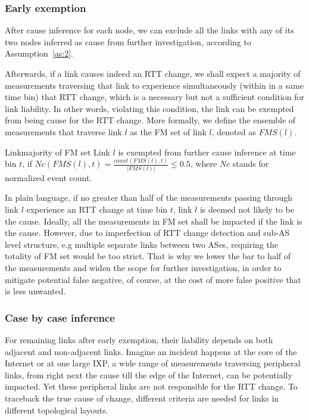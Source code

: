 \subsubsection{Early exemption}

After cause inference for each node, we can exclude all the links with any of its two nodes inferred as cause from further investigation, according to Assumption~\ref{as:2}.

Afterwards, if a link causes indeed an RTT change, we shall expect a majority of measurements traversing that link to experience simultaneously (within in a same time bin) that RTT change, which is a necessary but not a sufficient condition for link liability. In other words, violating this condition, the link can be exempted from being cause for the RTT change.
More formally, we define the ensemble of measurements that traverse link $l$ as the \acf{FM} set of link $l$, denoted as $FMS(l)$. 

\begin{heuristic}{Link}{majority of \ac{FM} set}\label{hu:link}
Link $l$ is exempted from further cause inference at time bin $t$, if $Nc(FMS(l), t) = \frac{count(FMS(l), t)}{|FMS(l)|} \leq 0.5$, where $Nc$ stands for normalized event count.
\end{heuristic}

In plain language, if no greater than half of the measurements passing through link $l$ experience an RTT change at time bin $t$, link $l$ is deemed not likely to be the cause. 
Ideally, all the measurements in \ac{FM} set shall be impacted if the link is the cause. However, due to imperfection of RTT change detection and sub-AS level structure, e.g multiple separate links between two ASes, requiring the totality of \ac{FM} set would be too strict. That is why we lower the bar to half of the measurements and widen the scope for further investigation, in order to mitigate potential false negative, of course, at the cost of more false positive that is less unwanted.

\subsubsection{Case by case inference}

For remaining links after early exemption, their liability depends on both adjacent and non-adjacent links. Imagine an incident happens at the core of the Internet or at one large IXP, a wide range of measurements traversing peripheral links, from right next the cause till the edge of the Internet, can be potentially impacted. Yet these peripheral links are not responsible for the RTT change. 
To traceback the true cause of change, different criteria are needed for links in different topological layouts.

